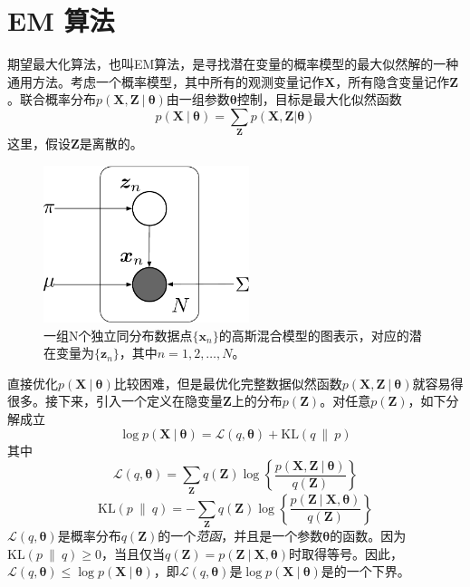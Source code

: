 \documentclass[11pt]{ctexbook}
\begin{document}
\section{EM 算法}
期望最大化算法，也叫EM算法，是寻找潜在变量的概率模型的最大似然解的一种通用方法。考虑一个概率模型，其中所有的观测变量记作$\bm X$，所有隐含变量记作$\bm Z$。联合概率分布$p(\bm X, \bm Z\ |\ \bm \theta)$由一组参数$\bm \theta $控制，目标是最大化似然函数
\begin{equation}
	p(\bm X\ |\ \bm \theta) = \sum_{\bm Z}p(\bm X, \bm Z | \bm \theta)
\end{equation}
这里，假设$\bm Z$是离散的。
\begin{figure}
	\centering
	\includegraphics[width=6cm]{EM-model}
	\caption{一组N个独立同分布数据点$\{\bm x_n\}$的高斯混合模型的图表示，对应的潜在变量为$\{\bm z_n\}$，其中$n=1,2,\ldots, N$。}
	\label{fig:em-model}
\end{figure}
直接优化$p(\bm X\ |\ \bm\theta)$比较困难，但是最优化完整数据似然函数$p(\bm X, \bm Z\ |\ \bm \theta)$就容易得很多。接下来，引入一个定义在隐变量$\bm Z$上的分布$p(\bm Z)$。对任意$p(\bm Z)$，如下分解成立
\begin{equation}
	\log p(\bm X\ |\ \bm\theta) = \mathcal L(q, \bm \theta) + \mathrm{KL}(q\ \|\ p)
\end{equation}
其中
\begin{equation}
	\mathcal L(q, \bm\theta) = \sum_{\bm Z}q(\bm Z)\log\left\{ \frac{p(\bm X,\bm Z\ |\ \bm \theta)}{q(\bm Z)}\right\}
\end{equation}
\begin{equation}
	\mathrm{KL}(p\ \|\ q) = -\sum_{\bm Z}q(\bm Z)\log\left\{\frac{p(\bm Z\ |\ \bm X, \bm\theta)}{q(\bm Z)}\right\}
\end{equation}
$\mathcal L(q, \bm\theta)$是概率分布$q(\bm Z)$的一个\emph{范函}，并且是一个参数$\bm\theta$的函数。因为$\mathrm{KL}(p\ \|\ q) \geqslant 0$，当且仅当$q(\bm Z) = p(\bm Z\ |\ \bm X, \bm\theta)$时取得等号。因此，$\mathcal L(q, \bm\theta) \leqslant \log p(\bm X\ |\ \bm\theta)$，即$\mathcal L(q, \bm\theta)$是$\log p(\bm X\ |\ \bm\theta)$是的一个下界。
\end{document}
